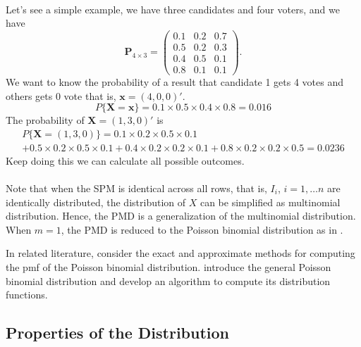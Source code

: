\documentclass[12pt]{article}
\begin{document}
\\
Let's see a simple example, we have three candidates and four voters, and we have
\begin{equation*}
\boldsymbol{P}_{4 \times 3} = \begin{pmatrix}
0.1 &  0.2 & 0.7\\
0.5 & 0.2 & 0.3\\
0.4 &  0.5 & 0.1\\
0.8 & 0.1 & 0.1
\end{pmatrix}.
\end{equation*}
We want to know the probability of a result that candidate 1 gets 4 votes and others  gets 0 vote that is, $\boldsymbol{x} =  (4,0,0)'$. 
\begin{equation*}
P\{\boldsymbol{X} = \boldsymbol{x}\} = 0.1\times 0.5 \times 0.4 \times 0.8 = 0.016
\end{equation*}
The probability of $\boldsymbol{X}=(1,3,0)'$ is
 \begin{multline*}
 P\{\boldsymbol{X} = (1,3,0)\} = 0.1\times 0.2 \times 0.5 \times 0.1\\ +
 0.5\times0.2\times0.5 \times 0.1 + 0.4\times0.2\times0.2\times0.1 + 0.8\times0.2\times0.2\times0.5 = 0.0236
 \end{multline*}
 Keep doing this we can calculate all possible outcomes.\\
 \\

Note that when the SPM is identical across all rows, that is, $I_{i}$, $i = 1, \dots n$ are identically distributed, the distribution of $X$ can be simplified as multinomial distribution. Hence, the PMD is a generalization of the multinomial distribution. When $m=1$, the PMD is reduced to the Poisson binomial distribution as in .

In related literature,  consider the exact and approximate methods for computing the pmf of the Poisson binomial distribution.  introduce the general Poisson binomial distribution and develop an algorithm to compute its distribution functions.


\subsection{Properties of the Distribution}
\end{document}
